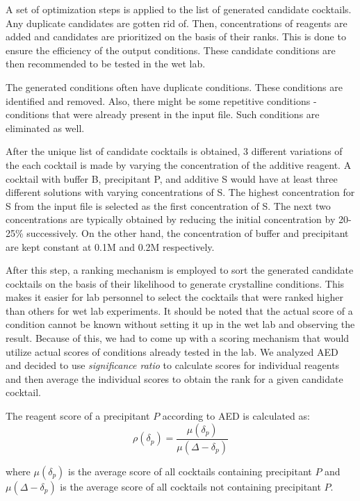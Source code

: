 A set of optimization steps is applied to the list of generated candidate cocktails. Any duplicate candidates are gotten rid of. Then, concentrations of reagents are added and candidates are prioritized on the basis of their ranks. This is done to ensure the efficiency of the output conditions. These candidate conditions are then recommended to be tested in the wet lab.

The generated conditions often have duplicate conditions. These conditions are identified and removed. Also, there might be some repetitive conditions - conditions that were already present in the input file. Such conditions are eliminated as well.

After the unique list of candidate cocktails is obtained, 3 different variations of the each cocktail is made  by varying the concentration of the additive reagent. A cocktail with buffer B, precipitant P, and additive S would have at least three different solutions with varying concentrations of S\cite{OptimizeAED,SamyamThesis}. The highest concentration for S from the input file is selected as the first concentration of S. The next two concentrations are typically obtained by reducing the initial concentration by 20-25\% successively\cite{OptimizeAED,SamyamThesis}. On the other hand, the concentration of buffer and precipitant are kept constant at 0.1M and 0.2M respectively\cite{OptimizeAED,SamyamThesis}.

After this step, a ranking mechanism is employed to sort the generated candidate cocktails on the basis of their likelihood to generate crystalline conditions. This makes it easier for lab personnel to select the cocktails that were ranked higher than others for wet lab experiments. It should be noted that the actual score of a condition cannot be known without setting it up in the wet lab and observing the result. Because of this, we had to come up with a scoring mechanism that would utilize actual scores of conditions already tested in the lab. We analyzed AED and decided to use \textit{significance ratio} to calculate scores for individual reagents and then average the individual scores to obtain the rank for a given candidate cocktail\cite{OptimizeAED}.

The reagent score of a precipitant $P$ according to AED is calculated as\cite{OptimizeAED}:
\begin{equation}
\rho(\delta_{p}) = \frac{\mu(\delta_{p})}{\mu(\Delta - \delta_{p})}
\label{eq}
\end{equation}

\noindent
where $\mu(\delta_{p})$ is the average score of all cocktails containing precipitant $P$ and $\mu(\Delta - \delta_{p})$ is the average score of all cocktails not containing precipitant $P$.

